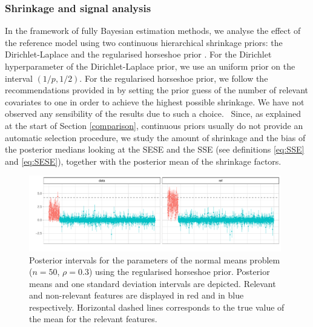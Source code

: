 \documentclass[american,]{article}
\theoremstyle{definition}
\begin{document}
\hypertarget{shrinkage-signal}{%
\subsubsection{Shrinkage and signal analysis}\label{shrinkage-signal}}
In the framework of fully Bayesian estimation methods, we analyse the effect of the reference model using two continuous hierarchical shrinkage priors: the Dirichlet-Laplace \citep{paper:dirichlet_laplace} and the regularised horseshoe prior \citep{paper:rhs}. 
For the Dirichlet hyperparameter of the Dirichlet-Laplace prior, we use an uniform prior on the interval $(1/p,1/2)$. For the regularised horseshoe prior, we follow the recommendations provided in \cite{paper:rhs} by setting the prior guess of the number of relevant covariates to one in order to achieve the highest possible shrinkage. We have not observed any sensibility of the results due to such a choice.
\
Since, as explained at the start of Section \ref{comparison}, continuous priors usually do not provide an automatic selection procedure, we study the amount of shrinkage and the bias of the posterior medians looking at the SESE and the SSE (see definitions \eqref{eq:SSE} and \eqref{eq:SESE}), together with the posterior mean of the shrinkage factors. 

\begin{figure}[tp]
  \centering
  \includegraphics[width=0.98\textwidth]{graphics/post_int.pdf}
  \caption{Posterior intervals for the parameters of the normal means problem ($n=50$, $\rho=0.3$) using the regularised horseshoe prior. Posterior means and one standard deviation intervals are depicted. Relevant and non-relevant features are displayed in red and in blue respectively. Horizontal dashed lines corresponds to the true value of the mean for the relevant features.\\}
  \label{fig:posterior_intervals}
\end{figure}
\end{document}
